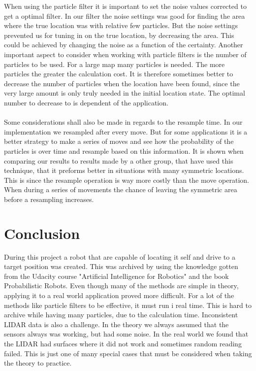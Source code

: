 When using the particle filter it is important to set the noise values corrected to get a optimal filter. In our filter the noise settings was good for finding the area where the true location was with relative few particles. But the noise settings prevented us for tuning in on the true location, by decreasing the area. This could be achieved by changing the noise as a function of the certainty.   
Another important aspect to consider when working with particle filters is the number of particles to be used. For a large map many particles is needed. The more particles the greater the calculation cost. It is therefore sometimes better to decrease the number of particles when the location have been found, since the very large amount is only truly needed in the initial location state. The optimal number to decrease  to is dependent of the application. \\\\
Some considerations shall also be made in regards to the resample time. In our implementation we resampled after every move. But for some applications it is a better strategy to make a series of moves and see how the probability of the particles is over time and resample based on this information. It is shown when comparing our results to results made by a other group, that have used this technique, that it preforms better in situations with many symmetric locations. This is since the resample operation is way more costly than the move operation. When during a series of movements the chance of leaving the symmetric area before a resampling increases. 


\chapter{Conclusion}
During this project a robot that are capable of locating it self and drive to a target position was created. This was archived by using the knowledge gotten from the Udacity course "Artificial Intelligence for Robotics"\cite{AIROK} and the book Probabilistic Robots. Even though many of the methods are simple in theory, applying it to a real world application proved more difficult. For a lot of the methods like particle filters to be effective, it must run i real time. This is hard to archive while having many particles, due to the calculation time. Inconsistent LIDAR data is also a challenge. In the theory we always assumed that the sensors always was working, but had some noise. In the real world we found that the LIDAR had surfaces where it did not work and sometimes random reading failed. This is just one of many special cases that must be considered when taking the theory to practice.  

